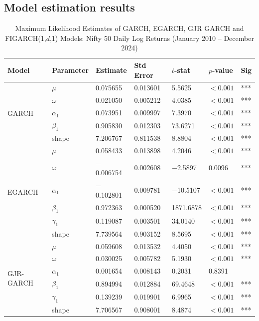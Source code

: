 \subsection{ Model estimation results}


\begin{table}[H]
\centering
\caption{Maximum Likelihood Estimates of GARCH, EGARCH, GJR GARCH and FIGARCH(1,$d$,1) Models: Nifty 50 Daily Log Returns (January 2010 -- December 2024)}
\label{tab:model_estimates}
\begin{tabular}{|l|l|l|l|l|l|l|}
\hline
\textbf{Model} & \textbf{Parameter} & \textbf{Estimate} & \textbf{Std Error} & \textbf{$t$-stat} & \textbf{$p$-value} & \textbf{Sig} \\
\hline
\multirow{5}{*}{GARCH}
 & $\mu$      & 0.075655 & 0.013601 & 5.5625   & $<0.001$ & *** \\
 & $\omega$   & 0.021050 & 0.005212 & 4.0385   & $<0.001$ & *** \\
 & $\alpha_1$ & 0.073951 & 0.009997 & 7.3970   & $<0.001$ & *** \\
 & $\beta_1$  & 0.905830 & 0.012303 & 73.6271  & $<0.001$ & *** \\
 & shape      & 7.206767 & 0.811538 & 8.8804   & $<0.001$ & *** \\
\hline
\multirow{6}{*}{EGARCH}
 & $\mu$      & 0.058433  & 0.013898 & 4.2046    & $<0.001$ & *** \\
 & $\omega$   & $-$0.006754 & 0.002608 & $-$2.5897 & 0.0096   & *** \\
 & $\alpha_1$ & $-$0.102801 & 0.009781 & $-$10.5107 & $<0.001$ & *** \\
 & $\beta_1$  & 0.972363  & 0.000520 & 1871.6878 & $<0.001$ & *** \\
 & $\gamma_1$ & 0.119087  & 0.003501 & 34.0140   & $<0.001$ & *** \\
 & shape      & 7.739564  & 0.903152 & 8.5695    & $<0.001$ & *** \\
\hline
\multirow{6}{*}{GJR-GARCH}
 & $\mu$      & 0.059608 & 0.013532 & 4.4050   & $<0.001$ & *** \\
 & $\omega$   & 0.030025 & 0.005782 & 5.1930   & $<0.001$ & *** \\
 & $\alpha_1$ & 0.001654 & 0.008143 & 0.2031   & 0.8391   &     \\
 & $\beta_1$  & 0.894994 & 0.012884 & 69.4648  & $<0.001$ & *** \\
 & $\gamma_1$ & 0.139239 & 0.019901 & 6.9965   & $<0.001$ & *** \\
 & shape      & 7.706567 & 0.908001 & 8.4874   & $<0.001$ & *** \\

\end{tabular}
\end{table}
